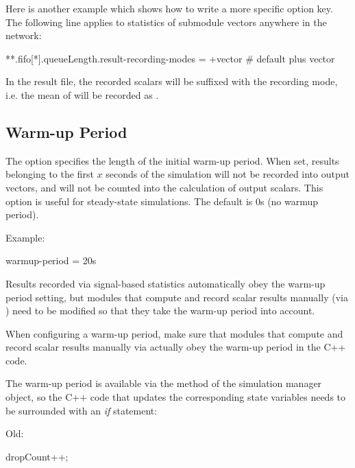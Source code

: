 Here is another example which shows how to write a more specific option
key. The following line applies to  statistics of
 submodule vectors anywhere in the network:

\begin{inifile}
**.fifo[*].queueLength.result-recording-modes = +vector  # default plus vector
\end{inifile}

In the result file, the recorded scalars will be suffixed with the recording mode,
i.e. the mean of  will be recorded as .


\subsection{Warm-up Period}
\label{sec:ana-sim:warmup-period}

The  option specifies the length of the initial
warm-up period. When set, results belonging to the first $x$ seconds
of the simulation will not be recorded into output vectors, and will
not be counted into the calculation of output scalars.
This option is useful for steady-state simulations. The default is 0s
(no warmup period).

Example:

\begin{inifile}
warmup-period = 20s
\end{inifile}

Results recorded via signal-based statistics automatically obey the warm-up
period setting, but modules that compute and record scalar results
manually (via ) need to be modified so that they take
the warm-up period into account.

\begin{note}
When configuring a warm-up period, make sure that modules that compute and
record scalar results manually via  actually obey the
warm-up period in the C++ code.
\end{note}

The warm-up period is available via the  method of
the simulation manager object, so the C++ code that updates the corresponding
state variables needs to be surrounded with an \textit{if} statement:

Old:

\begin{cpp}
dropCount++;
\end{cpp}

